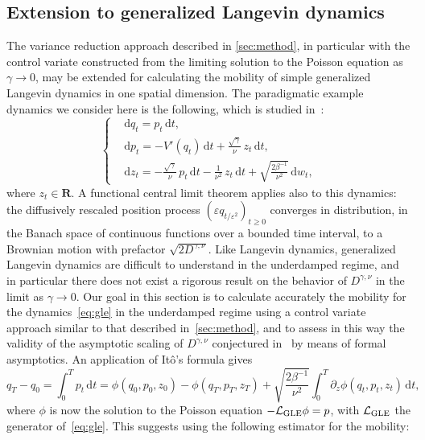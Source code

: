 \documentclass[11pt,a4paper]{article}
\newcommand{\real}{\mathbf R}
\renewcommand{\d}{\mathrm d}
\theoremstyle{plain}
\numberwithin{equation}{section}
\renewcommand{\geq}{\geqslant}
\begin{document}
\subsection{Extension to generalized Langevin dynamics}%
\label{sub:generalization_to_generalized_langevin_dynamics}
The variance reduction approach described in \cref{sec:method},
in particular with the control variate constructed from the limiting solution to the Poisson equation as $\gamma \to 0$,
may be extended for calculating the mobility of simple generalized Langevin dynamics in one spatial dimension.
The paradigmatic example dynamics we consider here is the following,
which is studied in~\cite{MR2793823,GPGSUV21}:
\begin{equation}
\label{eq:gle}
\left\{
  \begin{aligned}
      & \d q_t = p_t \, \d t, \\
      & \d p_t = - V'(q_t) \, \d t + \frac{\sqrt{\gamma}}{\nu} \, z_t \, \d t, \\
      & \d z_t = - \frac{\sqrt{\gamma}}{\nu} \, p_t  \, \d t
       -   \frac{1}{\nu^2} \, z_t \, \d t + \sqrt{\frac{2\beta^{-1}}{\nu^2}} \, \d w_t,
  \end{aligned}
\right.
\end{equation}
where $z_t \in \real$.
A functional central limit theorem applies also to this dynamics:
the diffusively rescaled position process $(\varepsilon q_{t/\varepsilon^2})_{t \geq 0}$ converges in distribution,
in the Banach space of continuous functions over a bounded time interval,
to a Brownian motion with prefactor $\sqrt{2 D^{\gamma, \nu}}$.
Like Langevin dynamics, generalized Langevin dynamics are difficult to understand in the underdamped regime,
and in particular there does not exist a rigorous result on the behavior of $D^{\gamma, \nu}$ in the limit as $\gamma \to 0$.
Our goal in this section is to calculate accurately the mobility for the dynamics~\eqref{eq:gle} in the underdamped regime
using a control variate approach similar to that described in~\cref{sec:method},
and to assess in this way the validity of the asymptotic scaling of $D^{\gamma,\nu}$ conjectured in~\cite{GPGSUV21} by means of formal asymptotics.
An application of It\^o's formula gives
\[
    q_T - q_0 = \int_{0}^{T} p_t \, \d t
    = \phi(q_0, p_0, z_0) - \phi(q_T, p_T, z_T) + \sqrt{\frac{2 \beta^{-1}}{\nu^2}} \int_{0}^{T} \partial_z \phi(q_t, p_t, z_t) \, \d t,
\]
where $\phi$ is now the solution to the Poisson equation $- \mathcal L_{\rm GLE} \phi = p$,
with $\mathcal L_{\rm GLE}$ the generator of~\eqref{eq:gle}.
This suggests using the following estimator for the mobility:
\end{document}
